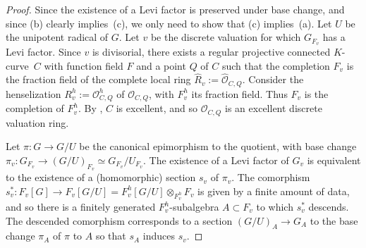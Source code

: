 \documentclass[12pt]{amsart}
\newcommand{\mc}[1]{\mathcal #1}
\newcommand{\wh}{\widehat}
\theoremstyle{plain}
\theoremstyle{definition}
\theoremstyle{remark}
\begin{document}
\begin{proof}
Since the existence of a Levi factor is preserved under base change, and since (b) clearly implies~(c), we only need to show that (c) implies~(a). 
Let $U$ be the unipotent radical of $G$.
Let $v$ be the discrete valuation for which $G_{F_v}$ has a Levi factor. Since $v$ is divisorial, there exists a regular projective connected  $K$-curve~$C$ with function field $F$ and a point $Q$ of $C$ such that the completion $F_v$ is the fraction field of the complete local ring $\wh R_v:=\wh {\mc O}_{C,Q}$.  Consider the henselization $R_v^h := {\mc O}^h_{C,Q}$ of ${\mc O}_{C,Q}$, with $F_v^h$ its fraction field.  Thus $F_v$ is the completion of $F_v^h$.  
By \cite[Proposition~7.8.6]{EGA4}, $C$ is excellent, and so ${\mc O}_{C,Q}$ is an excellent discrete valuation ring. 

Let $\pi: G\rightarrow G/U$ be the canonical epimorphism to the quotient, with base change $\pi_v: G_{F_v}\rightarrow (G/U)_{F_v}\simeq G_{F_v}/U_{F_v}$. The existence of a Levi factor of $G_v$ is equivalent to the existence of a (homomorphic) section $s_v$ of $\pi_v$. The comorphism $s_v^*: F_v[G]\rightarrow F_v[G/U]=F_v^h[G/U]\otimes_{F_v^h} F_v$ is given by a finite amount of data, and so there is a finitely generated $F_v^h$-subalgebra $A \subset F_v$ 
to which $s_v^*$ descends.  The descended comorphism corresponds to a section $(G/U)_A \to G_A$
to the base change $\pi_A$ of $\pi$ to $A$ so that $s_A$ induces $s_v$.


\end{proof}
\end{document}

